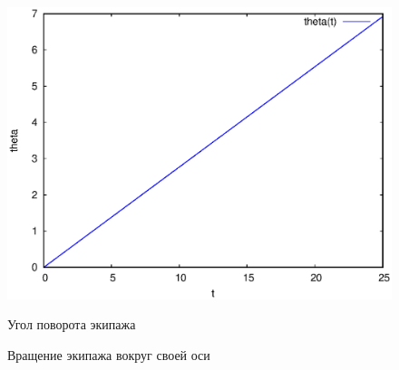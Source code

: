 \begin{figure}[h]
{        \includegraphics[scale=0.33]{content/pic/self_rot_25/theta.eps}
        \caption{Угол поворота экипажа}
        \label{fig:self_rot_25_theta}
    }
    \hspace{10pt}
    \caption{Вращение экипажа вокруг своей оси}
\end{figure}
\label{fig:self_rot}

\newpage



